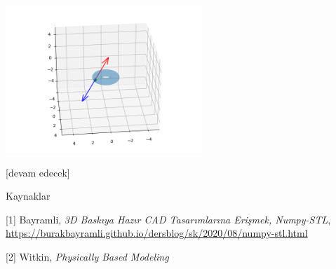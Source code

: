 \documentclass[12pt,fleqn]{article}\usepackage{../../common}
\begin{document}
\includegraphics[width=20em]{phy_005_basics_04_05.png}





[devam edecek]

Kaynaklar

[1] Bayramli, {\em 3D Baskıya Hazır CAD Tasarımlarına Erişmek, Numpy-STL},
    \url{https://burakbayramli.github.io/dersblog/sk/2020/08/numpy-stl.html}

[2] Witkin, {\em Physically Based Modeling}
\end{document}
